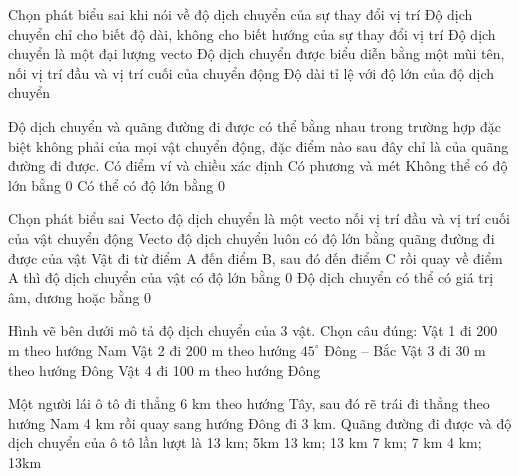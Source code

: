 \documentclass[Main.tex]{subfiles}
\begin{document}
			\begin{ex}
				[TH] Chọn phát biểu sai khi nói về độ dịch chuyển của sự thay đổi vị trí
				\choice
				{Độ dịch chuyển chỉ cho biết độ dài, không cho biết hướng của sự thay đổi vị trí}
				{Độ dịch chuyển là một đại lượng vecto}
				{Độ dịch chuyển được biểu diễn bằng một mũi tên, nối vị trí đầu và vị trí cuối của chuyển động}
				{Độ dài tỉ lệ với độ lớn của độ dịch chuyển}
				\loigiai{}
			\end{ex}
			
			\begin{ex}
				[TH] Độ dịch chuyển và quãng đường đi được có thể bằng nhau trong trường hợp đặc biệt không phải của mọi vật chuyển động, đặc điểm nào sau đây chỉ là của quãng đường đi được.
				\choice
				{Có điểm ví và chiều xác định}
				{Có phương và mét}
				{Không thể có độ lớn bằng 0}
				{Có thể có độ lớn bằng 0}
				\loigiai{}
			\end{ex}
			
			\begin{ex}
				[TH] Chọn phát biểu sai
				\choice
				{Vecto độ dịch chuyển là một vecto nối vị trí đầu và vị trí cuối của vật chuyển động}
				{Vecto độ dịch chuyển luôn có độ lớn bằng quãng đường đi được của vật}
				{Vật đi từ điểm A đến điểm B, sau đó đến điểm C rồi quay về điểm A thì độ dịch chuyển của vật có độ lớn bằng 0}
				{Độ dịch chuyển có thể có giá trị âm, dương hoặc bằng 0}
				\loigiai{}
			\end{ex}
			
			\begin{ex}
				[VD] Hình vẽ bên dưới mô tả độ dịch chuyển của 3 vật. Chọn câu đúng:
				\choice
				{Vật 1 đi 200 m theo hướng Nam}
				{Vật 2 đi 200 m theo hướng $45^\circ$ Đông – Bắc}
				{Vật 3 đi 30 m theo hướng Đông}
				{Vật 4 đi 100 m theo hướng Đông}
				\loigiai{}
			\end{ex}
			
			\begin{ex}
				[VD] Một người lái ô tô đi thẳng 6 km theo hướng Tây, sau đó rẽ trái đi thẳng theo hướng Nam 4 km rồi quay sang hướng Đông đi 3 km. Quãng đường đi được và độ dịch chuyển của ô tô lần lượt là
				\choice
				{13 km; 5km}
				{13 km; 13 km}
				{7 km; 7 km}
				{4 km; 13km}
				\loigiai{}
			\end{ex}
			
\end{document}
